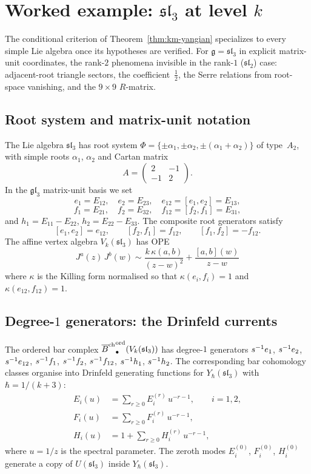 \section{Worked example: \texorpdfstring{$\mathfrak{sl}_3$}{affine sl(3)} at level \texorpdfstring{$k$}{k}}
\label{sec:sl3-ordered-bar}

The conditional criterion of Theorem~\ref{thm:km-yangian}
specializes to every simple Lie algebra once its hypotheses are
verified.
For $\mathfrak{g}=\mathfrak{sl}_3$ in
explicit matrix-unit coordinates, the rank-$2$ phenomena
invisible in the rank-$1$ ($\mathfrak{sl}_2$) case:
adjacent-root triangle sectors, the coefficient~$\frac12$,
the Serre relations from root-space vanishing, and the $9\times 9$
$R$-matrix.

\subsection{Root system and matrix-unit notation}

The Lie algebra $\mathfrak{sl}_3$ has root system
$\Phi=\{\pm\alpha_1,\pm\alpha_2,\pm(\alpha_1+\alpha_2)\}$
of type~$A_2$, with simple roots $\alpha_1$, $\alpha_2$ and
Cartan matrix
\[
A=\begin{pmatrix}2&-1\\-1&2\end{pmatrix}.
\]
In the $\mathfrak{gl}_3$ matrix-unit basis we set
\[
e_1=E_{12},\quad
e_2=E_{23},\quad
e_{12}=[e_1,e_2]=E_{13},
\]
\[
f_1=E_{21},\quad
f_2=E_{32},\quad
f_{12}=[f_2,f_1]=E_{31},
\]
and $h_1=E_{11}-E_{22}$, $h_2=E_{22}-E_{33}$. The composite root
generators satisfy
\[
[e_1,e_2]=e_{12},
\qquad
[f_2,f_1]=f_{12},
\qquad
[f_1,f_2]=-f_{12}.
\]
The affine vertex algebra $V_k(\mathfrak{sl}_3)$ has OPE
\[
J^a(z)\,J^b(w)\sim\frac{k\,\kappa(a,b)}{(z-w)^2}+\frac{[a,b](w)}{z-w}
\]
where $\kappa$ is the Killing form normalised so that
$\kappa(e_i,f_i)=1$ and $\kappa(e_{12},f_{12})=1$.

\subsection{Degree-\texorpdfstring{$1$}{1} generators: the Drinfeld currents}

The ordered bar complex
${\overline{B}^{\mathrm{ch}}}^{\mathrm{ord}}_\bullet(V_k(\mathfrak{sl}_3))$
has degree-$1$ generators
$s^{-1}e_1$, $s^{-1}e_2$, $s^{-1}e_{12}$,
$s^{-1}f_1$, $s^{-1}f_2$, $s^{-1}f_{12}$,
$s^{-1}h_1$, $s^{-1}h_2$.
The corresponding bar cohomology classes organise into
Drinfeld generating functions for $Y_\hbar(\mathfrak{sl}_3)$
with $\hbar = 1/(k+3)$:
\begin{align*}
E_i(u) &= \sum_{r\ge 0} E_i^{(r)}\,u^{-r-1},
\qquad i=1,2,\\
F_i(u) &= \sum_{r\ge 0} F_i^{(r)}\,u^{-r-1},\\
H_i(u) &= 1+\sum_{r\ge 0} H_i^{(r)}\,u^{-r-1},
\end{align*}
where $u=1/z$ is the spectral parameter. The zeroth modes
$E_i^{(0)}$, $F_i^{(0)}$, $H_i^{(0)}$ generate a copy of
$U(\mathfrak{sl}_3)$ inside $Y_\hbar(\mathfrak{sl}_3)$.

